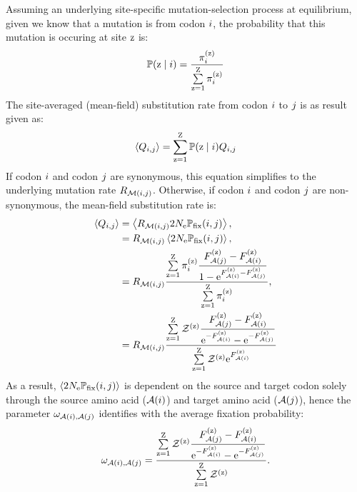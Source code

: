 Assuming an underlying site-specific mutation-selection process at equilibrium, given we know that a mutation is from codon ${i}$, the probability that this mutation is occuring at site $\text{z}$ is:
\begin{align}
    \mathbb{P} (\text{z} \mid {i}) = \dfrac{ \pi_{{i}}^{(\text{z})} }{\sum\limits_{\text{z}=1}^{\text{Z}} \pi_{{i}}^{(\text{z})} }
\end{align}
The site-averaged (mean-field) substitution rate from codon ${i}$ to ${j}$ is as result given as:
\begin{align}
    \left\langle Q_{{i}, {j}} \right\rangle = \sum\limits_{\text{z}=1}^{\text{Z}} \mathbb{P} (\text{z} \mid {i}) Q_{{i}, {j}}
\end{align}
If codon ${i}$ and codon ${j}$ are synonymous, this equation simplifies to the underlying mutation rate $R_{\mathcal{M}({i}, {j})}$.
Otherwise, if codon ${i}$ and codon ${j}$ are non-synonymous, the mean-field substitution rate is:
\begin{align}
    \left\langle Q_{{i}, {j}} \right\rangle & = \left\langle R_{\mathcal{M}({i}, {j})} 2 N_{\text{e}} \mathbb{P}_{\text{fix}} ({i}, {j}) \right\rangle, \\
    & = R_{\mathcal{M}({i}, {j})} \left\langle 2 N_{\text{e}} \mathbb{P}_{\text{fix}} ({i}, {j}) \right\rangle, \\
    & = R_{\mathcal{M}({i}, {j})} \dfrac{ \sum\limits_{\text{z}=1}^{\text{Z}} \pi_{{i}}^{(\text{z})} \dfrac{F_{\mathcal{A}({j})}^{(\text{z})} - F_{\mathcal{A}({i})}^{(\text{z})}}{1 - \text{e}^{F_{\mathcal{A}({i})}^{(\text{z})} - F_{\mathcal{A}({j})}^{(\text{z})}}} }{ \sum\limits_{\text{z}=1}^{\text{Z}} \pi_{{i}}^{(\text{z})} }, \\
    & = R_{\mathcal{M}({i}, {j})} \dfrac{ \sum\limits_{\text{z}=1}^{\text{Z}} \mathcal{Z}^{(\text{z})}  \dfrac{F_{\mathcal{A}({j})}^{(\text{z})} - F_{\mathcal{A}({i})}^{(\text{z})}}{ \text{e}^{-F_{\mathcal{A}({i})}^{(\text{z})}} - \text{e}^{ - F_{\mathcal{A}({j})}^{(\text{z})}}} }{  \sum\limits_{\text{z}=1}^{\text{Z}} \mathcal{Z}^{(\text{z})} \text{e}^{F_{\mathcal{A}({i})}^{(\text{z})}} }
\end{align}
As a result, $\left\langle 2 N_{\text{e}} \mathbb{P}_{\text{fix}} ({i}, {j}) \right\rangle$ is dependent on the source and target codon solely through the source amino acid ($\mathcal{A}({i})$) and target amino acid ($\mathcal{A}({j})$), hence the parameter $\omega_{\mathcal{A}({i}), \mathcal{A}({j})}$ identifies with the average fixation probability:
\begin{equation}
    \omega_{\mathcal{A}({i}), \mathcal{A}({j})} = \dfrac{ \sum\limits_{\text{z}=1}^{\text{Z}} \mathcal{Z}^{(\text{z})}  \dfrac{F_{\mathcal{A}({j})}^{(\text{z})} - F_{\mathcal{A}({i})}^{(\text{z})}}{ \text{e}^{-F_{\mathcal{A}({i})}^{(\text{z})}} - \text{e}^{ - F_{\mathcal{A}({j})}^{(\text{z})}}} }{  \sum\limits_{\text{z}=1}^{\text{Z}} \mathcal{Z}^{(\text{z})}  }.
\end{equation}

